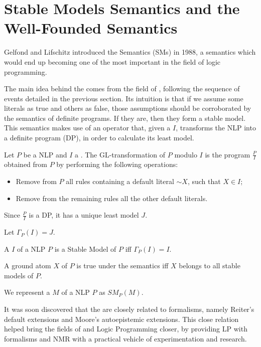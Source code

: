 \section{Stable Models Semantics and the Well-Founded Semantics}
Gelfond and Lifschitz introduced the \SMs Semantics (SMs) in 1988\cite{smMain}, a semantics which would end up becoming one of the most important in the field of logic programming. 

The main idea behind the \sms comes from the field of \nmr, following the sequence of events detailed in the previous section. Its intuition is that if we assume some literals as true and others as false, those assumptions should be corroborated by the semantics of definite programs\cite{predicateProgramming}. If they are, then they form a stable model. This semantics makes use of an operator that, given a \twovi $I$, transforms the NLP into a definite program (DP), in order to calculate its least model.

\begin{definition}[\GFo $\Gamma$]
Let $P$ be a NLP and $I$ a \twovi. The GL-transformation of $P$ modulo $I$ is the program $\frac{P}{I}$ obtained from $P$ by performing the following operations:

\begin{itemize}
	\item Remove from $P$ all rules containing a default literal $\sim X$, such that $X\in I$;
	\item Remove from the remaining rules all the other default literals.
\end{itemize}

Since $\frac{P}{I}$ is a DP, it has a unique least model $J$.

Let $\Gamma_{P}(I)=J$.
\end{definition}



\begin{definition}
A \twovi $I$ of a NLP $P$ is a Stable Model of $P$ iff $\Gamma_{P}(I)=I$.

A ground atom $X$ of $P$ is true under the \sms semantics iff $X$ belongs to all stable models of $P$.

We represent a \sm $M$ of a NLP $P$ as $SM_{P}(M)$.
\end{definition}

It was soon discovered\cite{bidoit,gelfondStratified} that the \sms are closely related to \nmr formalisms, namely Reiter's default extensions\cite{reiterDefault} and Moore's autoepistemic extensions\cite{mooreAutoepistemic}. This close relation helped bring the fields of \NMR and Logic Programming closer, by providing LP with \nmr formalisms and NMR with a practical vehicle of experimentation and research.

